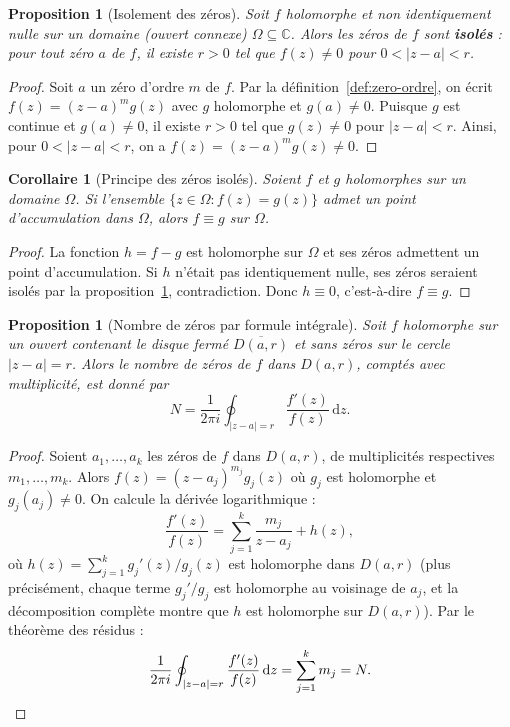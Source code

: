 \documentclass[12pt,a4paper,openany]{book}
\theoremstyle{definition}
\theoremstyle{plain}
\newtheorem{proposition}[definition]{Proposition}
\newtheorem{corollaire}[definition]{Corollaire}
\theoremstyle{remark}
\newcommand{\C}{\mathbb{C}}
\newcommand{\dd}{\mathrm{d}}
\newcommand{\abs}[1]{\left|#1\right|}
\begin{document}
\begin{proposition}[Isolement des zéros]\label{prop:zeros-isoles}
Soit $f$ holomorphe et non identiquement nulle sur un domaine (ouvert connexe)
$\Omega \subseteq \C$. Alors les zéros de $f$ sont \textbf{isolés} : pour tout
zéro $a$ de $f$, il existe $r > 0$ tel que $f(z) \neq 0$ pour
$0 < \abs{z - a} < r$.
\end{proposition}

\begin{proof}
Soit $a$ un zéro d'ordre $m$ de $f$. Par la définition~\ref{def:zero-ordre},
on écrit $f(z) = (z-a)^m g(z)$ avec $g$ holomorphe et $g(a) \neq 0$. Puisque
$g$ est continue et $g(a) \neq 0$, il existe $r > 0$ tel que $g(z) \neq 0$ pour
$\abs{z-a} < r$. Ainsi, pour $0 < \abs{z-a} < r$, on a
$f(z) = (z-a)^m g(z) \neq 0$.
\end{proof}

\begin{corollaire}[Principe des zéros isolés]\label{cor:zeros-isoles}
Soient $f$ et $g$ holomorphes sur un domaine $\Omega$. Si l'ensemble
$\{z \in \Omega : f(z) = g(z)\}$ admet un point d'accumulation dans $\Omega$,
alors $f \equiv g$ sur $\Omega$.
\end{corollaire}

\begin{proof}
La fonction $h = f - g$ est holomorphe sur $\Omega$ et ses zéros admettent un
point d'accumulation. Si $h$ n'était pas identiquement nulle, ses zéros seraient
isolés par la proposition~\ref{prop:zeros-isoles}, contradiction. Donc
$h \equiv 0$, c'est-à-dire $f \equiv g$.
\end{proof}

\begin{proposition}[Nombre de zéros par formule intégrale]\label{prop:nb-zeros-integrale}
Soit $f$ holomorphe sur un ouvert contenant le disque fermé $\overline{D(a,r)}$
et sans zéros sur le cercle $\abs{z - a} = r$. Alors le nombre de zéros de $f$
dans $D(a,r)$, comptés avec multiplicité, est donné par
\[
  N = \frac{1}{2\pi i} \oint_{\abs{z-a}=r} \frac{f'(z)}{f(z)} \, \dd z.
\]
\end{proposition}

\begin{proof}
Soient $a_1, \ldots, a_k$ les zéros de $f$ dans $D(a,r)$, de multiplicités
respectives $m_1, \ldots, m_k$. Alors $f(z) = (z - a_j)^{m_j} g_j(z)$ où
$g_j$ est holomorphe et $g_j(a_j) \neq 0$. On calcule la dérivée logarithmique :
\[
  \frac{f'(z)}{f(z)} = \sum_{j=1}^{k} \frac{m_j}{z - a_j} + h(z),
\]
où $h(z) = \sum_{j=1}^k g_j'(z)/g_j(z)$ est holomorphe dans $D(a,r)$
(plus précisément, chaque terme $g_j'/g_j$ est holomorphe au voisinage de $a_j$,
et la décomposition complète montre que $h$ est holomorphe sur $D(a,r)$).
Par le théorème des résidus :
\[
  \frac{1}{2\pi i} \oint_{\abs{z-a}=r} \frac{f'(z)}{f(z)} \, \dd z
  = \sum_{j=1}^{k} m_j = N. \qedhere
\]
\end{proof}
\end{document}
